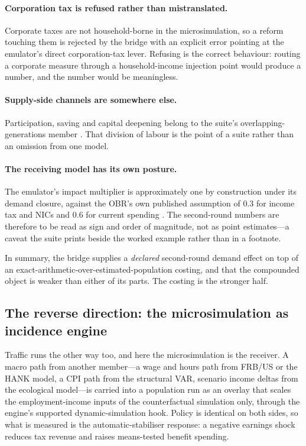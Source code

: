 \paragraph{Corporation tax is refused rather than mistranslated.} Corporate taxes are not household-borne in the microsimulation, so a reform touching them is rejected by the bridge with an explicit error pointing at the emulator's direct corporation-tax lever. Refusing is the correct behaviour: routing a corporate measure through a household-income injection point would produce a number, and the number would be meaningless.

\paragraph{Supply-side channels are somewhere else.} Participation, saving and capital deepening belong to the suite's overlapping-generations member \citep{ahmadi2026og}. That division of labour is the point of a suite rather than an omission from one model.

\paragraph{The receiving model has its own posture.} The emulator's impact multiplier is approximately one by construction under its demand closure, against the OBR's own published assumption of 0.3 for income tax and NICs and 0.6 for current spending \citep{ahmadi2026obr}. The second-round numbers are therefore to be read as sign and order of magnitude, not as point estimates---a caveat the suite prints beside the worked example rather than in a footnote.

In summary, the bridge supplies a \emph{declared} second-round demand effect on top of an exact-arithmetic-over-estimated-population costing, and that the compounded object is weaker than either of its parts. The costing is the stronger half.

\subsection{The reverse direction: the microsimulation as incidence engine}

Traffic runs the other way too, and here the microsimulation is the receiver. A macro path from another member---a wage and hours path from FRB/US or the HANK model, a CPI path from the structural VAR, scenario income deltas from the ecological model---is carried into a population run as an overlay that scales the employment-income inputs of the counterfactual simulation only, through the engine's supported dynamic-simulation hook. Policy is identical on both sides, so what is measured is the automatic-stabiliser response: a negative earnings shock reduces tax revenue and raises means-tested benefit spending.

